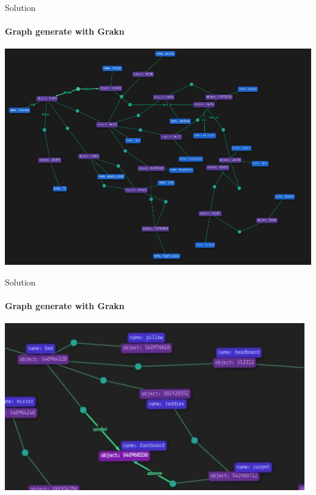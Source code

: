 \documentclass[aspectratio=169]{beamer}
\begin{document}
\begin{darkframes}
    \begin{frame}{Solution}
      \framesubtitle{\alert{Graph generate with Grakn}}%
      \begin{center}
        \includegraphics[width=0.7\linewidth]{allrel2}
      \end{center}
    \end{frame}   

    \begin{frame}{Solution}
      \framesubtitle{\alert{Graph generate with Grakn}}%
      \begin{center}
        \includegraphics[width=0.85\linewidth]{realcionGrafo}
      \end{center}
    \end{frame}  


\end{darkframes}
\end{document}
